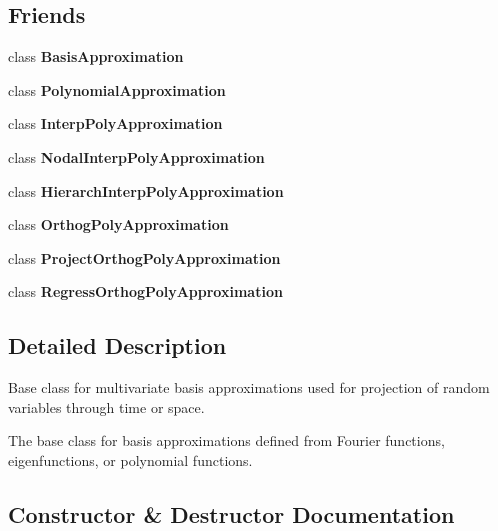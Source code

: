 \subsection*{Friends}
\begin{DoxyCompactItemize}
\item 
class {\bfseries Basis\+Approximation}\label{classPecos_1_1SharedBasisApproxData_a7e352b0aeef940589ce8267bd75085e9}

\item 
class {\bfseries Polynomial\+Approximation}\label{classPecos_1_1SharedBasisApproxData_aa778674dbdc525b64e1dbd7e9d30e42b}

\item 
class {\bfseries Interp\+Poly\+Approximation}\label{classPecos_1_1SharedBasisApproxData_aafe9d45ff8baa100e0ebb9b2692540c7}

\item 
class {\bfseries Nodal\+Interp\+Poly\+Approximation}\label{classPecos_1_1SharedBasisApproxData_a99c7b13c38f494e387170b138587e3fb}

\item 
class {\bfseries Hierarch\+Interp\+Poly\+Approximation}\label{classPecos_1_1SharedBasisApproxData_ac5be928f91f05e9db6cfd416fb6abdb4}

\item 
class {\bfseries Orthog\+Poly\+Approximation}\label{classPecos_1_1SharedBasisApproxData_ad950e19c243902dbc8e6c49ca6ab5d2b}

\item 
class {\bfseries Project\+Orthog\+Poly\+Approximation}\label{classPecos_1_1SharedBasisApproxData_a9f89a24cc1d6d15a8e1a9a460171f142}

\item 
class {\bfseries Regress\+Orthog\+Poly\+Approximation}\label{classPecos_1_1SharedBasisApproxData_a7acecaa6278f4c25fb2eea8c89e541d9}

\end{DoxyCompactItemize}


\subsection{Detailed Description}
Base class for multivariate basis approximations used for projection of random variables through time or space. 

The base class for basis approximations defined from Fourier functions, eigenfunctions, or polynomial functions. 

\subsection{Constructor \& Destructor Documentation}

